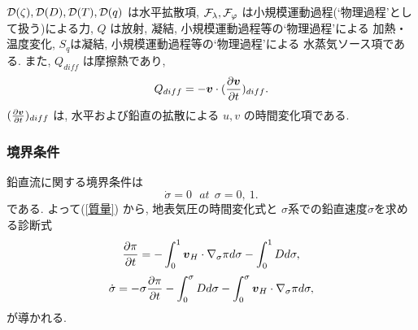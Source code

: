 ${\cal D}(\zeta), {\cal D}(D), {\cal D}(T), {\cal D}(q)$
は水平拡散項,
${\cal F}_\lambda, {\cal F}_\varphi$
は小規模運動過程(`物理過程'として扱う)による力,
$Q$ は放射, 凝結, 小規模運動過程等の`物理過程'による
加熱・温度変化,
$S_q$は凝結, 小規模運動過程等の`物理過程'による
水蒸気ソース項である.
また, $Q_{diff}$ は摩擦熱であり,
%
\begin{equation}
  Q_{diff}
 = - \Dvect{v} \cdot  ( \frac{\partial \Dvect{v}}{\partial t} )_{diff} .
\end{equation}
%
$( \frac{\partial \Dvect{v}}{\partial t} )_{diff} $ は,
水平および鉛直の拡散による $u,v$ の時間変化項である.

\subsubsection{境界条件}

鉛直流に関する境界条件は
%
\begin{equation}
  \dot{\sigma} = 0  \ \ \ at \ \ \sigma = 0 , \ 1 .
\end{equation}
%
である. よって(\ref{質量}) から,
地表気圧の時間変化式と
$\sigma$系での鉛直速度$\dot{\sigma}$を求める診断式
%
\begin{equation}
   \label{気圧傾向}
   \frac{\partial \pi}{\partial t}
   = - \int_{0}^{1} \Dvect{v}_{H} \cdot \nabla_{\sigma} \pi d \sigma
     - \int_{0}^{1} D  d \sigma ,
\end{equation}
%
\begin{equation}
   \label{鉛直速度}
   \dot{\sigma} 
   = - \sigma 
     \frac{\partial \pi}{\partial t}
     - \int_{0}^{\sigma} D d \sigma
     - \int_{0}^{\sigma} 
         \Dvect{v}_{H} \cdot \nabla_{\sigma} \pi d \sigma ,
\end{equation}
%
が導かれる.



